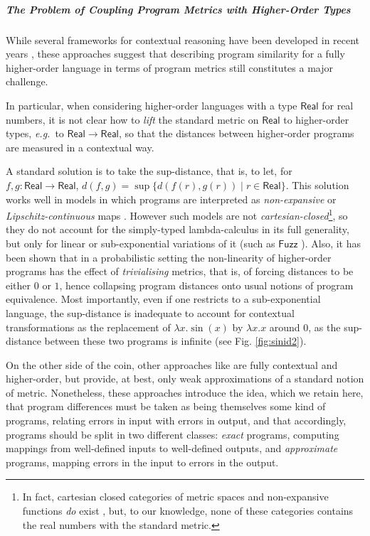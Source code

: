 \subparagraph*{The Problem of Coupling Program Metrics with Higher-Order Types}

 
While several frameworks  for contextual reasoning have been developed in recent years \cite{10.1145/1932681.1863568,Gaboardi_2013,Azevedo_de_Amorim_2017,chaudhuri, dallago:differential-stlc}, these approaches suggest that describing program similarity for a fully higher-order language in terms of program metrics still constitutes a major challenge. 

In particular, when considering higher-order languages with a type $\mathsf{Real}$ for real numbers, it is not clear how to \emph{lift} the standard metric on $\mathsf{Real}$  
 to higher-order types, \emph{e.g.}~to $\mathsf{Real}\to \mathsf{Real}$, so that the distances between higher-order programs are measured in a contextual way.



A standard solution is to take the sup-distance, that is, to let, for $f,g:\mathsf{Real}\to \mathsf{Real}$, $d(f,g)=\sup\{d(f(r),g(r))\mid r\in \mathsf{Real}\}$. This solution works well in models in which programs are interpreted as \emph{non-expansive} or \emph{Lipschitz-continuous} maps \cite{Hofmann2014, Azevedo_de_Amorim_2017}. However such models are not \emph{cartesian-closed}\footnote{In fact, cartesian closed categories of metric spaces and non-expansive functions \emph{do} exist \cite{Escardo1999, Stubbe2009}, but, to our knowledge, none of these categories contains the real numbers with the standard metric.}, so they do not account for 
 the simply-typed lambda-calculus in its full generality, but only for linear or sub-exponential variations of it (such as $\mathsf{Fuzz}$ \cite{10.1145/1932681.1863568,Gaboardi_2013,Azevedo_de_Amorim_2017}).
 Also, it has been shown \cite{10.1109/LICS.2015.64} that in a probabilistic setting the non-linearity of higher-order programs has the effect of \emph{trivialising} metrics, that is, of forcing distances to be either $0$ or $1$, hence collapsing program distances onto usual notions of program equivalence.
Most importantly, even if one restricts to a sub-exponential language, the sup-distance is inadequate to account for contextual transformations as the replacement of $\lambda x.\sin(x)$ by $\lambda x.x$ around $0$, as the sup-distance between these two programs is infinite (see Fig. \ref{fig:sinid2}). 
 
 
On the other side of the coin, other approaches like \cite{chaudhuri, dallago:differential-stlc} are fully contextual and higher-order, but provide, at best, only weak approximations of a standard notion of metric.  
 Nonetheless, these approaches introduce the idea, which we retain here, that program differences must be taken as being themselves some kind of programs, relating errors in input with errors in  output, and that accordingly, programs should be split in two different classes: \emph{exact} programs, computing mappings from well-defined inputs to well-defined outputs, and \emph{approximate} programs, mapping errors in the input to errors in the output.


